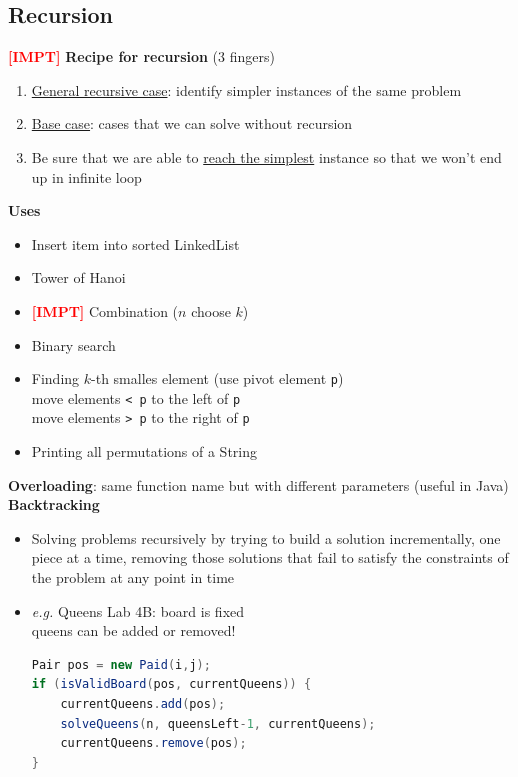 \documentclass{article}
\newcommand{\eg}[0]{\textit{e.g. }}
\newcommand{\impt}[0]{\textcolor{red}{\textbf{[IMPT] }}}
\begin{document}
\begin{multicols}{2}
\section{Recursion}
\impt \textbf{Recipe for recursion} (3 fingers)
\begin{enumerate}
	\item \underline{General recursive case}: identify simpler instances of the same problem
	\item \underline{Base case}: cases that we can solve without recursion
	\item Be sure that we are able to \underline{reach the simplest} instance so that we won't end up in infinite loop
\end{enumerate}
\textbf{Uses}
\begin{itemize}
	\item Insert item into sorted LinkedList
	\item Tower of Hanoi
	\item \impt Combination ($n$ choose $k$)
	\item Binary search
	\item Finding $k$-th smalles element (use pivot element \texttt{p})\\
	move elements \texttt{< p} to the left of \texttt{p}\\
	move elements \texttt{> p} to the right of \texttt{p}
	\item Printing all permutations of a String
\end{itemize}
\textbf{Overloading}: same function name but with different parameters (useful in Java)\\
\textbf{Backtracking}
\begin{itemize}
	\item Solving problems recursively by trying to build a solution incrementally, one piece at a time, removing those solutions that fail to satisfy the constraints of the problem at any point in time
	\item \eg Queens Lab 4B: board is fixed\\
	queens can be added or removed!
	\begin{lstlisting}[language=Java]
Pair pos = new Paid(i,j);
if (isValidBoard(pos, currentQueens)) {
	currentQueens.add(pos);
	solveQueens(n, queensLeft-1, currentQueens);
	currentQueens.remove(pos);
}
\end{lstlisting}
\end{itemize}

\end{multicols}
\end{document}
